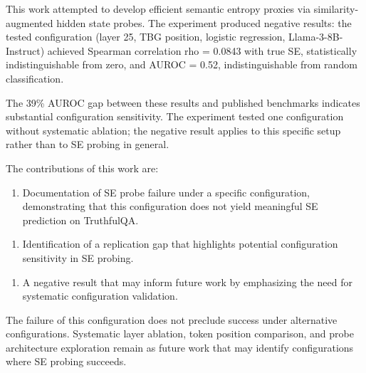 
This work attempted to develop efficient semantic entropy proxies via similarity-augmented hidden state probes. The experiment produced negative results: the tested configuration (layer 25, TBG position, logistic regression, Llama-3-8B-Instruct) achieved Spearman correlation rho = 0.0843 with true SE, statistically indistinguishable from zero, and AUROC = 0.52, indistinguishable from random classification.

The 39\% AUROC gap between these results and published benchmarks indicates substantial configuration sensitivity. The experiment tested one configuration without systematic ablation; the negative result applies to this specific setup rather than to SE probing in general.

The contributions of this work are:

\begin{enumerate}
\item Documentation of SE probe failure under a specific configuration, demonstrating that this configuration does not yield meaningful SE prediction on TruthfulQA.
\end{enumerate}

\begin{enumerate}
\item Identification of a replication gap that highlights potential configuration sensitivity in SE probing.
\end{enumerate}

\begin{enumerate}
\item A negative result that may inform future work by emphasizing the need for systematic configuration validation.
\end{enumerate}

The failure of this configuration does not preclude success under alternative configurations. Systematic layer ablation, token position comparison, and probe architecture exploration remain as future work that may identify configurations where SE probing succeeds.
